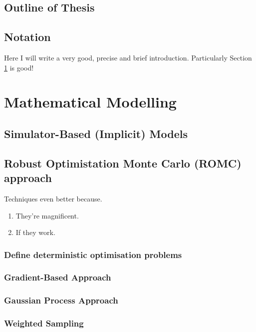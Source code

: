 \documentclass[11pt,twoside]{article}
\numberwithin{Theorem}{section}
\numberwithin{Definition}{section}
\numberwithin{Lemma}{section}
\numberwithin{Algorithm}{section}
\numberwithin{equation}{section}
\begin{document}
\subsection{Outline of Thesis}

\subsection{Notation}

Here I will write a very good, precise and brief introduction.
Particularly Section \ref{sec:background} is good!
\clearpage

\section{Mathematical Modelling}
\label{sec:background}

\clearpage

\subsection{Simulator-Based (Implicit) Models}


\clearpage

\subsection{Robust Optimistation Monte Carlo (ROMC) approach}
\label{sec:Techniques}

Techniques even better because.
\begin{enumerate}
 \item They're magnificent.
 \item If they work.
\end{enumerate}
\clearpage

\subsubsection{Define deterministic optimisation problems}

\subsubsection{Gradient-Based Approach}

\subsubsection{Gaussian Process Approach}

\subsubsection{Weighted Sampling}
\end{document}
